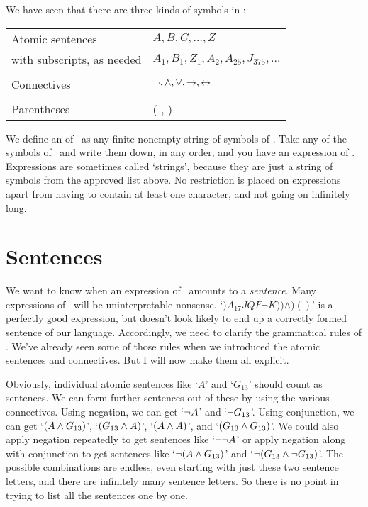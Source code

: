 We have seen that there are three kinds of symbols in \TFL:
\begin{center}
\begin{tabular}{l l} \toprule 
Atomic sentences & $A,B,C,…,Z$\\
with subscripts, as needed & $A_1, B_1,Z_1,A_2,A_{25},J_{375},…$\\
\\
Connectives & $\neg,\wedge,\vee,\rightarrow,\leftrightarrow$\\
\\
Parentheses &( , )\\
\bottomrule \end{tabular} 
\end{center}
We define an  of \TFL\ as any finite nonempty string of symbols of \TFL. Take any of the symbols of \TFL\ and write them down, in any order, and you have an expression of \TFL. Expressions are sometimes called `strings', because they are just a string of symbols from the approved list above. No restriction is placed on expressions apart from having to contain at least one character, and not going on infinitely long.


\section{Sentences}\label{s.sentencesTFL}
We want to know when an expression of \TFL\ amounts to a \emph{sentence}. Many expressions of \TFL\ will be uninterpretable nonsense. `$)A_{17}JQF¬K))\wedge)()$' is a perfectly good expression, but doesn't look likely to end up a correctly formed sentence of our language.  Accordingly, we need to clarify the grammatical rules of \TFL. We've already seen some of those rules when we introduced the atomic sentences and connectives. But I will now make them all explicit. 

Obviously, individual atomic sentences like `$A$' and `$G_{13}$' should count as sentences. We can form further sentences out of these by using the various connectives. Using negation, we can get `$\neg A$' and `$\neg G_{13}$'. Using conjunction, we can get `$(A \wedge G_{13})$', `$(G_{13} \wedge A)$', `$(A \wedge A)$', and `$(G_{13} \wedge G_{13})$'. We could also apply negation repeatedly to get sentences like `$\neg \neg A$' or apply negation along with conjunction to get sentences like `$\neg(A \wedge G_{13})$' and `$\neg(G_{13} \wedge \neg G_{13})$'. The possible combinations are endless, even starting with just these two sentence letters, and there are infinitely many sentence letters. So there is no point in trying to list all the sentences one by one.

